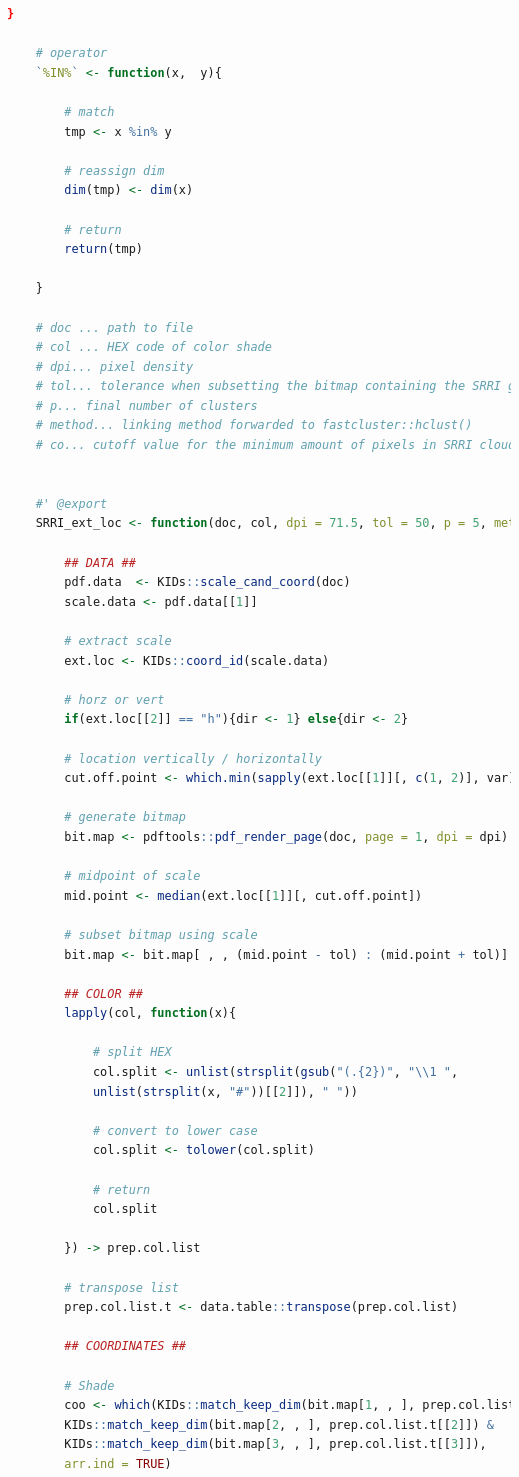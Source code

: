 \documentclass[aodsor,preprint]{imsart}
\numberwithin{equation}{section}
\theoremstyle{plain}
\begin{document}
\begin{lstlisting}[language = R, basicstyle = \tiny]
	}
	
	# operator
	`%IN%` <- function(x,  y){
		
		# match
		tmp <- x %in% y
		
		# reassign dim
		dim(tmp) <- dim(x)
		
		# return
		return(tmp)
		
	}

	# doc ... path to file
	# col ... HEX code of color shade
	# dpi... pixel density 
	# tol... tolerance when subsetting the bitmap containing the SRRI graph
	# p... final number of clusters
	# method... linking method forwarded to fastcluster::hclust()
	# co... cutoff value for the minimum amount of pixels in SRRI cloud ident.
	
	
	#' @export
	SRRI_ext_loc <- function(doc, col, dpi = 71.5, tol = 50, p = 5, method = "average", co = 0.2){
		
		## DATA ##
		pdf.data  <- KIDs::scale_cand_coord(doc)
		scale.data <- pdf.data[[1]]
		
		# extract scale
		ext.loc <- KIDs::coord_id(scale.data)
		
		# horz or vert
		if(ext.loc[[2]] == "h"){dir <- 1} else{dir <- 2}
		
		# location vertically / horizontally
		cut.off.point <- which.min(sapply(ext.loc[[1]][, c(1, 2)], var))
		
		# generate bitmap
		bit.map <- pdftools::pdf_render_page(doc, page = 1, dpi = dpi)
		
		# midpoint of scale
		mid.point <- median(ext.loc[[1]][, cut.off.point])
		
		# subset bitmap using scale
		bit.map <- bit.map[ , , (mid.point - tol) : (mid.point + tol)]
		
		## COLOR ##
		lapply(col, function(x){
			
			# split HEX
			col.split <- unlist(strsplit(gsub("(.{2})", "\\1 ",
			unlist(strsplit(x, "#"))[[2]]), " "))
			
			# convert to lower case
			col.split <- tolower(col.split)
			
			# return
			col.split
			
		}) -> prep.col.list
		
		# transpose list
		prep.col.list.t <- data.table::transpose(prep.col.list)
		
		## COORDINATES ##
		
		# Shade
		coo <- which(KIDs::match_keep_dim(bit.map[1, , ], prep.col.list.t[[1]]) &
		KIDs::match_keep_dim(bit.map[2, , ], prep.col.list.t[[2]]) &
		KIDs::match_keep_dim(bit.map[3, , ], prep.col.list.t[[3]]),
		arr.ind = TRUE)
		

\end{lstlisting}
\end{document}
